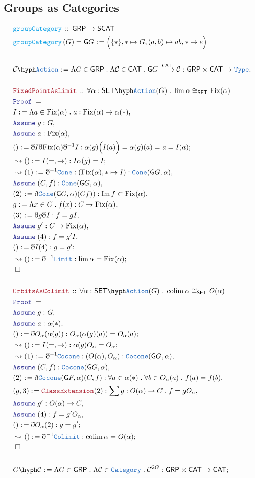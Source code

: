 \documentclass[12pt]{scrartcl}
\newcommand{\TYPE}[1]{\textcolor{NavyBlue}{\mathtt{#1}}}
\newcommand{\FUNC}[1]{\textcolor{Cerulean}{\mathtt{#1}}}
\newcommand{\LOGIC}[1]{\textcolor{Blue}{\mathtt{#1}}}
\newcommand{\THM}[1]{\textcolor{Maroon}{\mathtt{#1}}}
\renewcommand{\.}{\; . \;}
\newcommand{\de}{: \kern 0.1pc =}
\newcommand{\Act}[1]{\left( #1 \right)}
\newcommand{\Theorem}[2]{& \THM{#1} \, :: \, #2 \\ & \Proof = \\ }
\newcommand{\DeclareFunc}[2]{& \FUNC{#1} \, :: \, #2 \\}
\newcommand{\DefineNamedFunc}[4]{&  \FUNC{#1}\Act{#2} = #3 \de #4 \\}
\newcommand{\Page}[1]{ \begin{align*} #1 \end{align*}   }
\newcommand{ \bd }{ \ByDef }
\newcommand{\Type}{\TYPE{Type}}
\DeclareMathOperator*{\im}{Im}
\newcommand{\Cat}{\TYPE{Category}}
\newcommand{\Say}[3]{& #1 \de #2 : #3, \\}
\newcommand{\Conclude}[3]{& #1 \de #2 : #3; \\}
\newcommand{\Derive}[3]{& \leadsto #1 \de #2 : #3, \\}
\newcommand{\DeriveConclude}[3]{& \leadsto #1 \de #2 : #3 ; \\}
\newcommand{\Assume}[2]{& \LOGIC{Assume} \; #1 : #2, \\}
\newcommand{\QED}{\; \square}
\newcommand{\EndProof}{& \QED \\}
\newcommand{\ByDef}{\eth}
\newcommand{\Proof}{\LOGIC{Proof} \; }
\newcommand{\Arrow}[1]{\xrightarrow{#1}}
\DeclareMathOperator*{\colim}{colim}
\newcommand{\C}{\mathcal{C}}
\newcommand{\G}{\mathsf{G}}
\newcommand{\CAT}{\mathsf{CAT}}
\newcommand{\SET}{\mathsf{SET}}
\newcommand{\GRP}{\mathsf{GRP}}
\begin{document}
\subsection{Groups as Categories}
\Page{
	\DeclareFunc{groupCategory}{\GRP \to \mathsf{SCAT}}
	\DefineNamedFunc{groupCategory}{G}{\G G}
	{ \Big( \{*\} , * \mapsto G, (a,b)  \mapsto ab, * \mapsto e   \Big)  } 
	\\
	\Conclude{\C \hyph \TYPE{Action}}{ \Lambda G \in \GRP \. \Lambda \C \in \CAT \. \G G \Arrow{\CAT} \C  }{ \GRP \times \CAT \to \Type}
	\\
	\Theorem{FixedPointAsLimit}{ \forall \alpha : \SET\hyph\TYPE{Action}(G) \.  \lim \alpha   \cong_{\SET} \mathrm{Fix}(\alpha)}
	\Say{I}{\Lambda a \in \mathrm{Fix}(\alpha) \. a}{\mathrm{Fix}(\alpha) \to  \alpha(*)  }
	\Assume{g}{G}
	\Assume{a}{\mathrm{Fix}(\alpha)}
	\Conclude{()}{\bd I \bd \mathrm{Fix}(\alpha)\bd^{-1}I}{ \alpha(g)\Big( I(a) \Big) = \alpha(g)(a) = a = I(a)  }
	\DeriveConclude{()}{ I(=,\to) }{ I\alpha(g) = I}
	\Derive{(1)}{\bd^{-1} \TYPE{Cone}}{ (\mathrm{Fix}(\alpha),* \mapsto I) : \TYPE{Cone}(\G G, \alpha)   }
	\Assume{(C,f)}{\TYPE{Cone}(\G G, \alpha)}
	\Say{(2)}{\bd \TYPE{Cone}(\G G, \alpha)(C f))}{ \im f \subset \mathrm{Fix}(\alpha)}
	\Say{ g }{ \Lambda x \in C \. f(x)}{ C \to \mathrm{Fix}(\alpha)}
	\Say{(3)}{\bd g \bd I}{ f = gI}
	\Assume{g'}{ C \to \mathrm{Fix}(\alpha) }
	\Assume{(4)}{f = g'I}
	\Conclude{()}{\bd I (4) }{g = g'}
	\DeriveConclude{()}{\bd^{-1} \TYPE{Limit}}{ \lim \alpha = \mathrm{Fix}(\alpha)}
	\EndProof
	\\
	\Theorem{OrbitsAsColimit}{\forall \alpha : \SET\hyph\TYPE{Action}(G) \. \colim \alpha \cong_{\SET} O(\alpha)}
	\Assume{g}{G}
	\Assume{a}{\alpha(*)}
	\Conclude{()}{\bd O_\alpha(\alpha(g))}{ O_\alpha(\alpha(g)(a)) =  O_\alpha(a) }
	\DeriveConclude{()}{I(=,\to)}{ \alpha(g)O_\alpha  = O_\alpha }
	\Derive{ (1)  }{\bd^{-1}\TYPE{Cocone}}{  (O(\alpha),O_\alpha) : \TYPE{Cocone}(\G G, \alpha) }
	\Assume{(C,f)}{\TYPE{Cocone}(\G G, \alpha)}
	\Say{(2)}{\bd \TYPE{Cocone}(\G F,\alpha)(C,f)}{\forall a \in \alpha(*) \. \forall b \in O_\alpha(a) \. f(a) = f(b)}
	\Say{(g,3)}{\THM{ClassExtension}(2)}{ \sum g : O(\alpha) \to C \. f = g O_\alpha  }
	\Assume{g'}{ O(\alpha) \to C}
	\Assume{(4)}{f = g' O_\alpha}
	\Conclude{()}{\bd O_\alpha (2)}{g = g'}
	\DeriveConclude{()}{\bd^{-1} \TYPE{Colimit}}{\colim \alpha = O(\alpha)}
	\EndProof
	\\
	\Conclude{G\hyph\C}{ \Lambda G \in \GRP \. \Lambda \C \in \Cat \.  \C^{\G G}  }{\GRP\times\CAT \to \CAT}
}
\newpage
\end{document}
